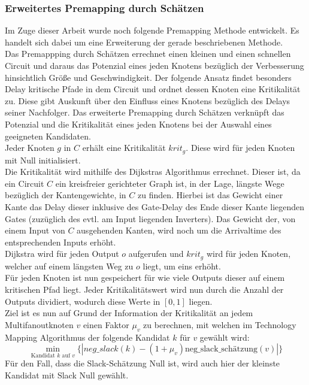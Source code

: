 \documentclass[11pt, a4paper, german]{article}
\newcommand{\TM}{Technology  Mapping }
\begin{document}
\subsubsection{Erweitertes Premapping durch Schätzen}
\label{subsec:erweitertes_premapping_durch_schaetzen}
Im Zuge dieser Arbeit wurde noch folgende Premapping Methode entwickelt. 
Es handelt sich dabei um eine Erweiterung der gerade beschriebenen Methode. \\
Das Premappping durch Schätzen errechnet einen kleinen und einen schnellen Circuit und daraus das Potenzial eines jeden Knotens bezüglich der Verbesserung hinsichtlich Größe und Geschwindigkeit. Der folgende Ansatz findet besonders Delay kritische Pfade in dem Circuit und ordnet dessen Knoten eine Kritikalität zu. Diese gibt Auskunft über den Einfluss eines Knotens bezüglich des Delays seiner Nachfolger. Das erweiterte Premapping durch Schätzen verknüpft das Potenzial und die Kritikalität eines jeden Knotens bei der Auswahl eines geeigneten Kandidaten. \\

Jeder Knoten $g$ in $C$ erhält eine Kritikalität $krit_g$. Diese wird für jeden Knoten mit Null initialisiert. \\
Die Kritikalität wird mithilfe des Dijkstras Algorithmus errechnet. Dieser ist, da ein Circuit $C$ ein kreisfreier gerichteter Graph ist, in der Lage, längste Wege bezüglich der Kantengewichte,  in $C$ zu finden. Hierbei ist das Gewicht einer Kante das Delay dieser inklusive des Gate-Delay des Ende dieser Kante liegenden Gates (zuzüglich des evtl. am Input liegenden Inverters). Das Gewicht der, von einem Input von $C$ ausgehenden Kanten, wird noch um die Arrivaltime des entsprechenden Inputs erhöht. \\
Dijkstra wird für jeden Output $o$ aufgerufen und $krit_g$ wird für jeden Knoten, welcher auf einem längsten Weg zu $o$ liegt, um eins erhöht.\\

Für jeden Knoten ist nun gespeichert für wie viele Outputs dieser auf einem kritischen Pfad liegt. Jeder Kritikalitätswert wird nun durch die Anzahl der Outputs dividiert, wodurch diese Werte in $[0,1]$ liegen.\\

Ziel ist es nun auf Grund der Information der Kritikalität an jedem Multifanoutknoten $v$ einen Faktor $\mu_v$ zu berechnen, mit welchen im \TM Algorithmus der folgende Kandidat $k$ für $v$  gewählt wird: 
\[\min\limits_{\text{Kandidat }k\text{ auf }v}\{|neg\_slack(k)-(1+\mu_v)\text{neg\_slack\_sch\"atzung}(v)|\}\]
Für den Fall, dass die Slack-Schätzung Null ist, wird auch hier der kleinste Kandidat mit Slack Null gewählt.\\
\end{document}
